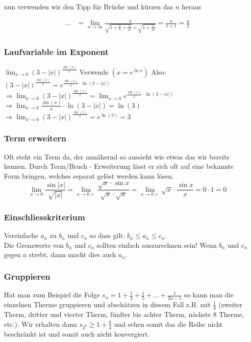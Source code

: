 nun verwenden wir den Tipp für Brüche und kürzen das $n$ heraus

\begin{align*}
\ldots &= \lim_{n \to \infty} \frac{a}{\sqrt{1 + \frac{a}{n} + \frac{1}{n^2}} +
\sqrt{1 + \frac{1}{n^2}}} = \frac{a}{1 + 1} = \frac{a}{2}
\end{align*}

\subsubsection{Laufvariable im Exponent}
$\lim_{x \to 0} (3 - |x|)^{\frac{\sin(x)}{x}}$\newline
Verwende $(x = e^{\ln x})$ Also: $(3 - |x|)^{\frac{\sin(x)}{x}} = e^{\frac{\sin(x)}{x} \cdot \ln(3 -
|x|)}$\newline
$\Rightarrow 
\lim_{x \to 0} (3 - |x|)^{\frac{\sin(x)}{x}} = \lim_{x \to 0}e^{\frac{\sin(x)}{x} \cdot \ln(3 -
|x|)}$\newline
$\Rightarrow \lim_{x \to 0}\frac{\sin(x)}{x}\cdot \ln(3-|x|) = \ln(3)$\newline
$\Rightarrow \lim_{x \to 0}(3 - |x|)^{\frac{\sin(x)}{x}} = e^{\ln(3)} = 3$

\subsubsection{Term erweitern}
Oft steht ein Term da, der annähernd so aussieht wie etwas das wir bereits kennen. Durch Term/Bruch - Erweiterung lässt er sich oft auf eine bekannte Form bringen, welches separat gelöst werden kann lösen.
\[
	\lim_{x \to 0} \frac{\sin |x|}{\sqrt{|x|}} = 
	\lim_{x \to 0+} \frac{\sqrt{x} \cdot \sin x}{\sqrt{x} \cdot \sqrt{x}} =
	\lim_{x \to 0+} \sqrt{x} \cdot \frac{\sin x}{x} = 0 \cdot 1 = 0
\]

\subsubsection{Einschliesskriterium}
Vereinfache $a_n$ zu $b_n$ und $c_n$ so dass gilt: $b_n \leq a_n \leq c_n$. \\
Die Grenzwerte von $b_n$ und $c_n$ sollten einfach auszurechnen sein! 
Wenn $b_n$ und $c_n$ gegen $a$ strebt, dann macht dies auch $a_n$.

\subsubsection{Gruppieren}
Hat man zum Beispiel die Folge $s_n = 1 + \frac{1}{3} + \frac{1}{5} + ... + \frac{1}{2n-1}$ so kann man die 
einzelnen Therme gruppieren und abschätzen in diesem Fall z.B. mit $\frac{1}{4}$ (zweiter Therm, dritter und vierter Therm,
fünfter bis achter Therm, nächste 8 Therme, etc.). Wir erhalten dann $s_{2^k} \geq 1 + \frac{k}{4}$ und sehen somit das die 
Reihe nicht beschränkt ist und somit auch nicht konvergiert.